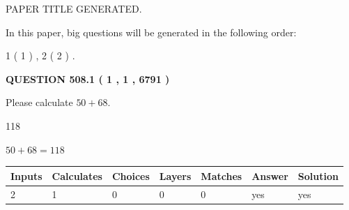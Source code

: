 \documentclass[12pt]{article}
\begin{document}
   
\vspace{0.2in}
   
   
   
   
   
   
   
   
 \vspace{0.2in}
 
 
 
 
   
   
 PAPER TITLE GENERATED.
   
   
   
\vspace{0.2in}
   
In this paper, big questions will be generated in the following order: 
   
   
   1 ( 1 )
 ,
   2 ( 2 )
 .
  
\vspace{0.2in}
  
{\textbf{\Large{QUESTION
508.1 
 ( 1 , 1 , 6791 )
}}}
  
  
 
Please calculate $ %
50 +  %
68 $.
 
 
 
\noindent{}
 
 

118
 
 
\noindent{}
 
 

 
 
 
\noindent{}
 
 

$ %
50 +  %
68=   %
118$
 
 
\noindent{}
 
 

 
   
   
   
   
\noindent\begin{tabular}{|l|l|l|l|l|l|l|}
 \hline
Inputs & Calculates & Choices & Layers & Matches & Answer & Solution \\ \hline
 2  & 
 1  & 
 0
  & 
 0  & 
 0  & 
  yes & 
  yes 
  \\ \hline
 \end{tabular}
   
\end{document}
